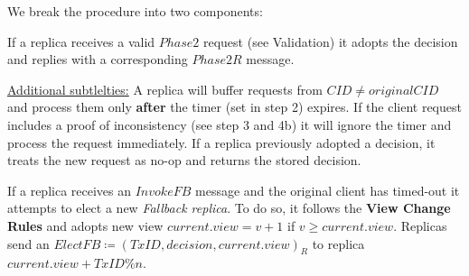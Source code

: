 We break the procedure into two components:

If a replica receives a valid $Phase2$ request (see Validation) it adopts the decision and replies with a corresponding $Phase2R$ message.

\underline{Additional subtlelties:} A replica will buffer requests from $CID \neq originalCID$ and process them only \textbf{after} the timer (set in step 2) expires. If the client request includes a proof of inconsistency (see step 3 and 4b) it will ignore the timer and process the request immediately. If a replica previously adopted a decision, it treats the new request as no-op and returns the stored decision.



If a replica receives an $InvokeFB$ message and the original client has timed-out it attempts to elect a new \textit{Fallback replica}. To do so, it follows the \textbf{View Change Rules} and adopts new view $current.view = v+1$ if $v \geq current.view$. 
Replicas send an $ElectFB \coloneqq (TxID, decision, current.view)_R$ to replica $current.view + TxID \% n$. 


